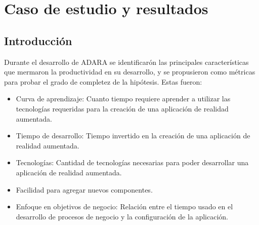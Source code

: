 \documentclass[12pt,a4paper,spanish,openany]{book}
\begin{document}
\chapter{Caso de estudio y resultados}


\section{Introducción}

Durante el desarrollo de ADARA se identificarón las principales características
que mermaron la productividad en su desarrollo, y se propusieron como métricas
para probar el grado de completez de la hipótesis. Estas fueron:

\begin{itemize}
  \item Curva de aprendizaje: Cuanto tiempo requiere aprender a utilizar las
  tecnologías requeridas para la creación de una aplicación de realidad
  aumentada.
  \item Tiempo de desarrollo: Tiempo invertido en la creación de una aplicación
  de realidad aumentada.
  \item Tecnologías: Cantidad de tecnologías necesarias para poder desarrollar
  una aplicación de realidad aumentada.
  \item Facilidad para agregar nuevos componentes.
  \item Enfoque en objetivos de negocio: Relación entre el tiempo usado en el
  desarrollo de procesos de negocio y la configuración de la aplicación.
\end{itemize}
\end{document}
